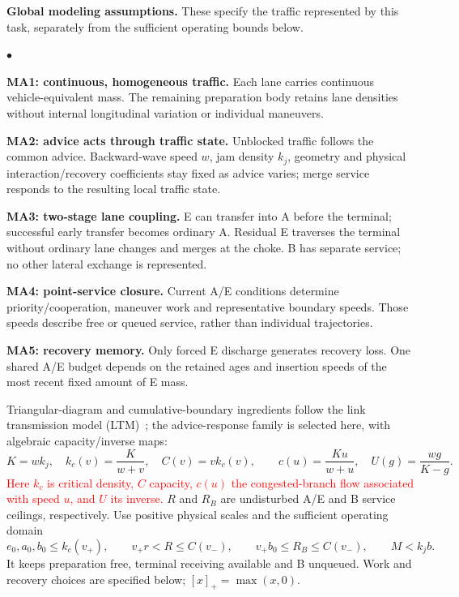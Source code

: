 \documentclass[10pt,a4paper]{article}
\newcommand{\rev}[1]{\textcolor{red}{#1}}
\newenvironment{points}{\begin{list}{$\bullet$}{%
 \setlength{\leftmargin}{1.4em}\setlength{\labelwidth}{0.7em}%
 \setlength{\labelsep}{0.4em}\setlength{\itemsep}{2pt}%
 \setlength{\parsep}{0pt}\setlength{\topsep}{3pt}}}{\end{list}}
\begin{document}
\begingroup\color{red}
\textbf{Global modeling assumptions.} These specify the traffic represented
by this task, separately from the sufficient operating bounds below.
\begin{points}
\item \textbf{MA1: continuous, homogeneous traffic.} Each lane carries
continuous vehicle-equivalent mass. The remaining preparation body retains
lane densities without internal longitudinal variation or individual maneuvers.
\item \textbf{MA2: advice acts through traffic state.} Unblocked traffic
follows the common advice. Backward-wave speed $w$, jam density $k_j$,
geometry and physical interaction/recovery coefficients stay fixed as advice
varies; merge service responds to the resulting local traffic state.
\item \textbf{MA3: two-stage lane coupling.} E can transfer into A before
the terminal; successful early transfer becomes ordinary A. Residual E
traverses the terminal without ordinary lane changes and merges at the choke.
B has separate service; no other lateral exchange is represented.
\item \textbf{MA4: point-service closure.} Current A/E conditions determine
priority/cooperation, maneuver work and representative boundary speeds.
Those speeds describe free or queued service, rather than individual trajectories.
\item \textbf{MA5: recovery memory.} Only forced E discharge generates
recovery loss. One shared A/E budget depends on the retained ages and
insertion speeds of the most recent fixed amount of E mass.
\end{points}
\endgroup

Triangular-diagram and cumulative-boundary ingredients follow the link
transmission model (LTM)~\cite{jin}; the advice-response family is selected
here, with algebraic capacity/inverse maps:
\begin{equation}
 K=wk_j,\quad k_c(v)=\frac{K}{w+v},\quad C(v)=vk_c(v),\qquad
 c(u)=\frac{Ku}{w+u},\quad U(g)=\frac{wg}{K-g}.
 \label{eq:fd}
\end{equation}
\rev{Here $k_c$ is critical density, $C$ capacity, $c(u)$ the
congested-branch flow associated with speed $u$, and $U$ its inverse.}
$R$ and $R_B$ are undisturbed A/E and B service ceilings, respectively.
Use positive physical scales and the sufficient operating domain
\begin{equation}
 e_0,a_0,b_0\leq k_c(v_+),\qquad
 v_+r<R\leq C(v_-),\qquad v_+b_0\leq R_B\leq C(v_-),\qquad M<k_jb.
 \label{eq:domain}
\end{equation}
It keeps preparation free, terminal receiving available and B unqueued.
Work and recovery choices are specified below; $[x]_+=\max(x,0)$.
\end{document}
